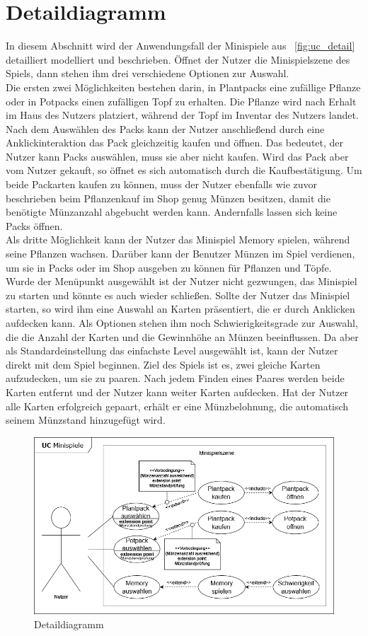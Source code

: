 \section{Detaildiagramm}\label{sec:detaildiagramme}
In diesem Abschnitt wird der Anwendungsfall der Minispiele aus ~\autoref{fig:uc_detail} detailliert modelliert und 
beschrieben.
Öffnet der Nutzer die Minispielszene des Spiels, dann stehen ihm drei verschiedene Optionen zur Auswahl.\\
\newline
Die ersten zwei Möglichkeiten bestehen darin, in Plantpacks eine zufällige Pflanze oder in Potpacks einen zufälligen 
Topf zu erhalten. 
Die Pflanze wird nach Erhalt im Haus des Nutzers platziert, während der Topf im Inventar des Nutzers landet.
Nach dem Auswählen des Packs kann der Nutzer anschließend durch eine Anklickinteraktion das Pack gleichzeitig kaufen
und öffnen. 
Das bedeutet, der Nutzer kann Packs auswählen, muss sie aber nicht kaufen.
Wird das Pack aber vom Nutzer gekauft, so öffnet es sich automatisch durch die Kaufbestätigung. 
Um beide Packarten kaufen zu können, muss der Nutzer ebenfalls wie zuvor beschrieben beim Pflanzenkauf im Shop genug 
Münzen besitzen, damit die benötigte Münzanzahl abgebucht werden kann. 
Andernfalls lassen sich keine Packs öffnen.\\
\newpage
Als dritte Möglichkeit kann der Nutzer das Minispiel Memory spielen, während seine Pflanzen wachsen. 
Darüber kann der Benutzer Münzen im Spiel verdienen, um sie in Packs oder im Shop ausgeben zu können für Pflanzen und 
Töpfe.
Wurde der Menüpunkt ausgewählt ist der Nutzer nicht gezwungen, das Minispiel zu starten und könnte es auch wieder
schließen.
Sollte der Nutzer das Minispiel starten, so wird ihm eine Auswahl an Karten präsentiert, die er durch Anklicken
aufdecken kann.
Als Optionen stehen ihm noch Schwierigkeitsgrade zur Auswahl, die die Anzahl der Karten und die Gewinnhöhe an Münzen
beeinflussen.
Da aber als Standardeinstellung das einfachste Level ausgewählt ist, kann der Nutzer direkt mit dem Spiel beginnen.
Ziel des Spiels ist es, zwei gleiche Karten aufzudecken, um sie zu paaren.
Nach jedem Finden eines Paares werden beide Karten entfernt und der Nutzer kann weiter Karten aufdecken.
Hat der Nutzer alle Karten erfolgreich gepaart, erhält er eine Münzbelohnung, die automatisch seinem Münzstand
hinzugefügt wird. \\

\vspace{2cm}
\begin{figure}[h]
    \centering
    \includegraphics[width=\linewidth]{../bilder/uc_detail}
    \vspace{0.05cm}
    \caption{Detaildiagramm}
    \label{fig:uc_detail}
\end{figure}